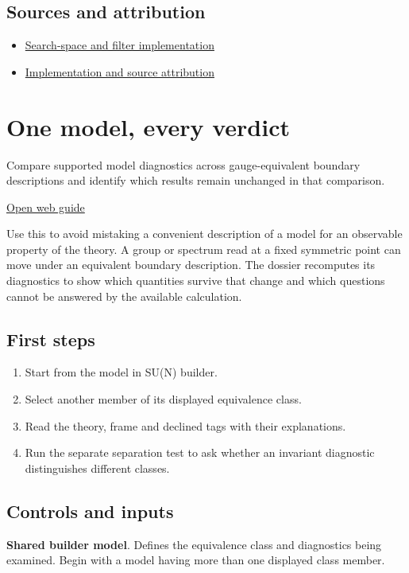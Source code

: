 \documentclass[11pt,a4paper]{article}
\begin{document}
\subsection*{Sources and attribution}
\begin{itemize}
\item \href{https://github.com/karlesmarin/ghu-lab/blob/main/src/modules/sweep5d.mjs}{Search-space and filter implementation}
\item \href{https://github.com/karlesmarin/ghu-lab/blob/main/src/sections/sweep5d_section.js}{Implementation and source attribution}
\end{itemize}
\section{One model, every verdict}
Compare supported model diagnostics across gauge-equivalent boundary descriptions and identify which results remain unchanged in that comparison.

\href{https://karlesmarin.github.io/ghu-explorer/guide/dossier/index.html}{Open web guide}

Use this to avoid mistaking a convenient description of a model for an observable property of the theory. A group or spectrum read at a fixed symmetric point can move under an equivalent boundary description. The dossier recomputes its diagnostics to show which quantities survive that change and which questions cannot be answered by the available calculation.
\subsection*{First steps}
\begin{enumerate}
\item Start from the model in SU(N) builder.
\item Select another member of its displayed equivalence class.
\item Read the theory, frame and declined tags with their explanations.
\item Run the separate separation test to ask whether an invariant diagnostic distinguishes different classes.
\end{enumerate}
\subsection*{Controls and inputs}
\textbf{Shared builder model}. Defines the equivalence class and diagnostics being examined. Begin with a model having more than one displayed class member.
\end{document}
